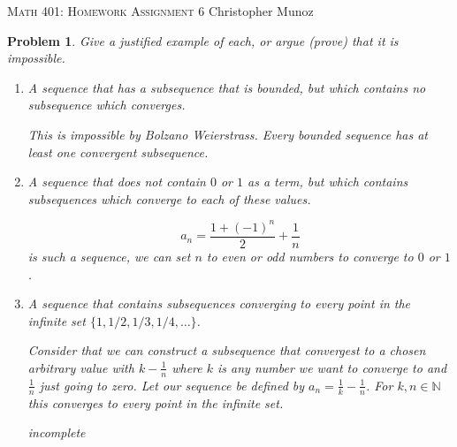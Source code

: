 \documentclass[12pt]{article}
\newtheorem{problem}{Problem}
\newcommand{\NN}{\ensuremath{\mathbb N}}
\begin{document}
\small
\noindent \textsc{Math 401: Homework Assignment 6} \hfill Christopher Munoz

\normalsize
\bigskip

\setcounter{problem}{35}

\begin{problem} %
Give a justified example of each, or argue (prove) that it is impossible.

\renewcommand{\labelenumi}{(\alph{enumi})}
\begin{enumerate}
\item A sequence that has a subsequence that is bounded, but which contains no subsequence which converges.

This is impossible by Bolzano Weierstrass. Every bounded sequence has at least one convergent subsequence.

\item A sequence that does not contain $0$ or $1$ as a term, but which contains subsequences which converge to each of these values.

$$a_n = \frac{1 + (-1)^n}{2} + \frac{1}{n}$$ is such a sequence, we can set $n$ to even or odd numbers to converge to $0$ or $1$.

\item A sequence that contains subsequences converging to every point in the infinite set $\{1,1/2,1/3,1/4,\dots\}$.

  Consider that we can construct a subsequence that convergest to a chosen arbitrary value with $k - \frac{1}{n}$ where $k$ is any number we want to converge to and $\frac{1}{n}$ just going to zero. Let our sequence be defined by $a_n = \frac{1}{k} - \frac{1}{n}$. For $k, n \in \NN$ this converges to every point in the infinite set.

  incomplete
\end{enumerate}
\end{problem}
\end{document}
